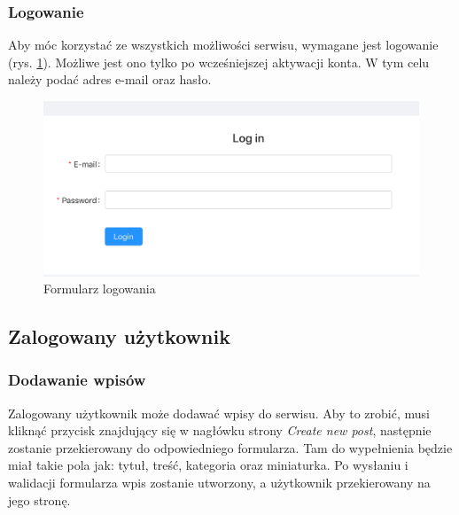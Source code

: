 \documentclass[declaration,shortabstract]{iithesis}
\begin{document}
\subsubsection{Logowanie}
Aby móc korzystać ze wszystkich możliwości serwisu, wymagane jest logowanie (rys. \ref{fig:login}). Możliwe jest ono tylko po wcześniejszej aktywacji konta. W tym celu należy podać adres e-mail oraz hasło.

\begin{figure}
    \centering
    \includegraphics[width=\linewidth]{images/logowanie.png}
    \caption{Formularz logowania}
    \label{fig:login}
\end{figure}

\subsection{Zalogowany użytkownik}

\subsubsection{Dodawanie wpisów}
Zalogowany użytkownik może dodawać wpisy do serwisu. Aby to zrobić, musi kliknąć przycisk znajdujący się w nagłówku strony \textit{Create new post}, następnie zostanie przekierowany do odpowiedniego formularza. Tam do wypełnienia będzie miał takie pola jak: tytuł, treść, kategoria oraz miniaturka. Po wysłaniu i walidacji formularza wpis zostanie utworzony, a użytkownik przekierowany na jego stronę.
\end{document}
